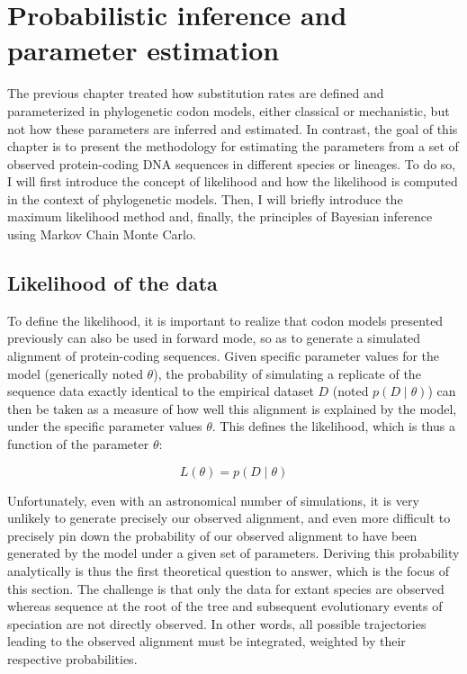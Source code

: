 \chapter{Probabilistic inference and parameter estimation}
{\hypersetup{linkcolor=GREYDARK}\minitoc}
\label{chap:intro-inference}

The previous chapter treated how substitution rates are defined and parameterized in phylogenetic codon models, either classical or mechanistic, but not how these parameters are inferred and estimated.
In contrast, the goal of this chapter is to present the methodology for estimating the parameters from a set of observed protein-coding \acrshort{DNA} sequences in different species or lineages.
To do so, I will first introduce the concept of likelihood and how the likelihood is computed in the context of phylogenetic models.
Then, I will briefly introduce the maximum likelihood method and, finally, the principles of Bayesian inference using Markov Chain Monte Carlo.


\section{Likelihood of the data}
\label{sec-intro:likelihood}

To define the likelihood, it is important to realize that codon models presented previously can also be used in forward mode, so as to generate a simulated alignment of protein-coding sequences.
Given specific parameter values for the model (generically noted $\theta$), the probability of simulating a replicate of the sequence data exactly identical to the empirical dataset $D$ (noted $p(D \mid \theta)$) can then be taken as a measure of how well this alignment is explained by the model, under the specific parameter values $\theta$.
This defines the likelihood, which is thus a function of the parameter $\theta$:

\begin{equation}
    L(\theta) = p(D \mid \theta)
\end{equation}

Unfortunately, even with an astronomical number of simulations, it is very unlikely to generate precisely our observed alignment, and even more difficult to precisely pin down the probability of our observed alignment to have been generated by the model under a given set of parameters.
Deriving this probability analytically is thus the first theoretical question to answer, which is the focus of this section.
The challenge is that only the data for extant species are observed whereas sequence at the root of the tree and subsequent evolutionary events of speciation are not directly observed.
In other words, all possible trajectories leading to the observed alignment must be integrated, weighted by their respective probabilities.

